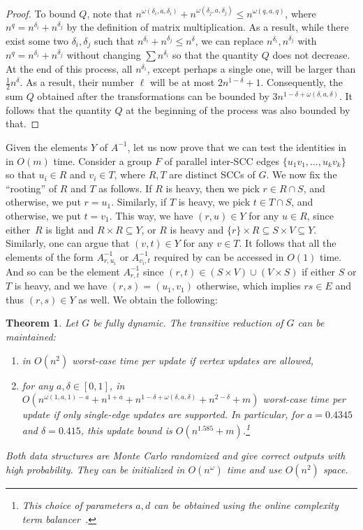\documentclass[11pt]{article}
\newtheorem{theorem}{Theorem}[section]
\begin{document}
{\begin{proof}
To bound $Q$, note that
$n^{\omega(\delta_i,a,\delta_i)}+n^{\omega(\delta_j,a,\delta_j)}\leq n^{\omega(q,a,q)}$,
where $n^q=n^{\delta_i}+n^{\delta_j}$ by the definition
of matrix multiplication.
As a result, while there exist
some two $\delta_i,\delta_j$ such that $n^{\delta_i}+n^{\delta_j}\leq n^{\delta}$,
we can replace $n^{\delta_i},n^{\delta_j}$ with $n^q=n^{\delta_i}+n^{\delta_j}$
without changing $\sum n^{\delta_i}$  so that the quantity $Q$ does not decrease.
At the end of this process, all $n^{\delta_i}$, except perhaps a single one, 
will be larger than $\frac{1}{2}n^{\delta}$.
As a result, their number $\ell$ will be at most $2n^{1-\delta}+1$. Consequently,
the sum $Q$ obtained after the transformations can be bounded by $3n^{1-\delta+\omega(\delta,a,\delta)}$.
It follows that the quantity $Q$ at the beginning of the process was also
bounded by that.
\end{proof}
Given the elements $Y$ of $A^{-1}$, let us now prove that we can 
test the identities in  in $O(m)$ time.
Consider a group $F$ of parallel inter-SCC edges $\{u_1v_1,\ldots,u_kv_k\}$
so that $u_i\in R$ and $v_i\in T$, where $R,T$ are distinct SCCs of $G$.
We now fix the ``rooting'' of $R$ and $T$ as follows.
If $R$ is heavy, then we pick $r\in R\cap S$, and otherwise, we put $r=u_1$.
Similarly, if $T$ is heavy, we pick $t\in T\cap S$, and otherwise, we put $t=v_1$.
This way, we have $(r,u)\in Y$ for any $u\in R$, since either\
$R$ is light and $R\times R\subseteq Y$, or $R$ is heavy and $\{r\}\times R\subseteq S\times V\subseteq Y$.
Similarly, one can argue that $(v,t)\in Y$ for any $v\in T$.
It follows that all the elements of the form $A^{-1}_{r,u_i}$
or $A^{-1}_{v_i,t}$ required by  can be accessed in $O(1)$ time. And so can be the element $A^{-1}_{r,t}$ since $(r,t)\in (S\times V)\cup (V\times S)$
if either $S$ or $T$ is heavy, and we have $(r,s)=(u_1,v_1)$ otherwise,
which implies $rs\in E$ and thus $(r,s)\in Y$ as well.
We obtain the following:
\begin{theorem}\label{thm:algebraic-general}
    Let $G$ be fully dynamic. The transitive reduction of $G$ can be maintained:
    \begin{enumerate}[label=(\arabic*)]
        \item in $O(n^2)$ worst-case time per update if vertex updates are allowed,
        \item for any $a,\delta\in [0,1]$, in $O(n^{\omega(1,a,1)-a}+n^{1+a}+n^{1-\delta+\omega(\delta,a,\delta)}+n^{2-\delta}+m)$ worst-case time per update if only single-edge updates are supported. In particular, for $a=0.4345$
        and $\delta=0.415$, this update bound is $O(n^{1.585}+m)$.\footnote{This choice of parameters $a,d$ can be obtained using the online complexity term balancer~\cite{Complexity}.}
    \end{enumerate}
    Both data structures are Monte Carlo randomized and give correct outputs with high probability.
    They can be initialized in $O(n^\omega)$ time and use $O(n^2)$ space.
\end{theorem}

}
\end{document}
